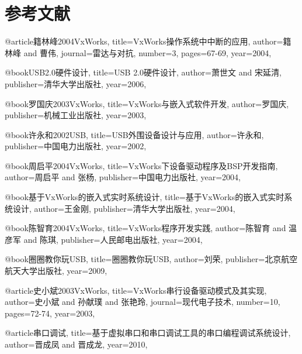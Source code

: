 \section{参考文献}

@article{籍林峰2004VxWorks,
  title={VxWorks操作系统中中断的应用},
  author={籍林峰 and 曹伟},
  journal={雷达与对抗},
  number={3},
  pages={67-69},
  year={2004},
}


@book{USB2.0硬件设计,
  title={USB 2.0硬件设计},
  author={萧世文 and 宋延清},
  publisher={清华大学出版社},
  year={2006},
}


@book{罗国庆2003VxWorks,
  title={VxWorks与嵌入式软件开发},
  author={罗国庆},
  publisher={机械工业出版社},
  year={2003},
}


@book{许永和2002USB,
  title={USB外围设备设计与应用},
  author={许永和},
  publisher={中国电力出版社},
  year={2002},
}


@book{周启平2004VxWorks,
  title={VxWorks下设备驱动程序及BSP开发指南},
  author={周启平 and 张杨},
  publisher={中国电力出版社},
  year={2004},
}

@book{基于VxWorks的嵌入式实时系统设计,
  title={基于VxWorks的嵌入式实时系统设计},
  author={王金刚},
  publisher={清华大学出版社},
  year={2004},
}

@book{陈智育2004VxWorks,
  title={VxWorks程序开发实践},
  author={陈智育 and 温彦军 and 陈琪},
  publisher={人民邮电出版社},
  year={2004},
}


@book{圈圈教你玩USB,
  title={圈圈教你玩USB},
  author={刘荣},
  publisher={北京航空航天大学出版社},
  year={2009},
}

@article{史小斌2003VxWorks,
  title={VxWorks串行设备驱动模式及其实现},
  author={史小斌 and 孙献璞 and 张艳玲},
  journal={现代电子技术},
  number={10},
  pages={72-74},
  year={2003},
}


@article{串口调试,
  title={基于虚拟串口和串口调试工具的串口编程调试系统设计},
  author={晋成凤 and 晋成龙},
  year={2010},
}














